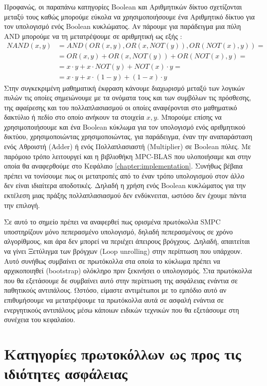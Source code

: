 Προφανώς, οι παραπάνω κατηγορίες Boolean και Αριθμητικών δίκτυο σχετίζονται μεταξύ τους καθώς μπορούμε εύκολα να χρησιμοποιήσουμε ένα Αριθμητικό δίκτυο για τον υπολογισμό ενός Boolean κυκλώματος. Αν πάρουμε για παράδειγμα μια πύλη AND μπορούμε να τη μετατρέψουμε σε αριθμητική ως εξής :
%
\[
\begin{aligned}
    NAND(x, y)  &= AND(OR(x,y), OR(x,NOT(y)), OR(NOT(x),y)) =\\
                &= OR(x,y) + OR(x,NOT(y)) + OR(NOT(x),y) =\\
                &= x \cdot y + x \cdot NOT(y) + NOT(x) \cdot y =\\
                &= x \cdot y + x \cdot (1-y) + (1-x) \cdot y
\end{aligned}
\]
%
Στην συγκεκριμένη μαθηματική έκφραση κάνουμε διαχωρισμό μεταξύ των λογικών πυλών τις οποίες σημειώνουμε με τα ονόματα τους και των συμβόλων τις πρόσθεσης, της αφαίρεσης και του πολλαπλασιασμού οι οποίες αναφέρονται στο μαθηματικό δακτύλιο ή πεδίο στο οποίο ανήκουν τα στοιχεία $x,y$. Μπορούμε επίσης να χρησιμοποιήσουμε και ένα Boolean κύκλωμα για τον υπολογισμό ενός αριθμητικού δικτύου, χρησιμοποιώντας χρησιμοποιώντας, για παράδειγμα, έναν την αναπαράσταση ενός Αθροιστή (Adder) ή ενός Πολλαπλασιαστή (Multiplier) σε Boolean πύλες. Με παρόμοιο τρόπο λειτουργεί και η βιβλιοθήκη MPC-BLAS που υλοποιήσαμε και στην οποία θα αναφερθούμε στο Κεφάλαιο \ref{chapter:implementation}. Συνήθως βέβαια πρέπει να τονίσουμε πως οι μετατροπές από το έναν τρόπο υπολογισμού στον άλλο δεν είναι ιδιαίτερα αποδοτικές. Δηλαδή η χρήση ενός Boolean κυκλώματος για την εκτέλεση μιας πράξης πολλαπλασιασμού δεν ενδύκνειται, ωστόσο δεν έχουμε πάντα την επιλογή.

Σε αυτό το σημείο πρέπει να αναφερθεί πως ορισμένα πρωτόκολλα SMPC υποστηρίζουν μόνο πεπερασμένο υπολογισμό, δηλαδή πεπερασμένους σε χρόνο αλγορίθμους, και άρα δεν μπορεί να περιέχει άπειρους βρόγχους. Δηλαδή, απαιτείται να γίνει Ξετύλιγμα των βρόγχων (Loop unrolling) στην περίπτωση που υπάρχουν. Αυτό συνήθως συμβαίνει σε πρωτόκολλα στα οποία το κύκλωμα πρέπει να αρχικοποιηθεί (bootstrap) ολόκληρο πριν ξεκινήσει ο υπολογισμός. Στα πρωτόκολλα που θα εξετάσουμε δε συμβαίνει αυτό στην περίπτωση της ασφάλειας ενάντια σε παθητικούς αντιπάλους. Ωστόσο, είμαστε αντιμέτωποι με το εμπόδιο αυτό αν επιθυμήσουμε να μετατρέψουμε τα πρωτόκολλα αυτά σε ασφαλή ενάντια σε ενεργητικούς αντιπάλους μέσω κάποιων ειδικών τεχνικών που θα εξετάσουμε στη συνέχεια του κεφαλαίου.

\section{Κατηγορίες πρωτοκόλλων ως προς τις ιδιότητες ασφάλειας}

